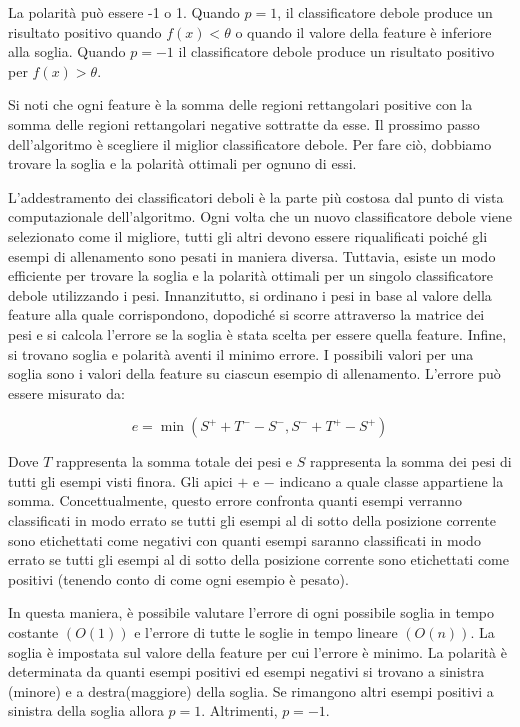 La polarità può essere -1 o 1. Quando $p=1$, il classificatore debole produce un risultato positivo quando $f(x)<\theta$ o quando il valore della feature è inferiore alla soglia. Quando $p=-1$ il classificatore debole produce un risultato positivo per $f(x)>\theta$.\newpage

Si noti che ogni feature è la somma delle regioni rettangolari positive con la somma delle regioni rettangolari negative sottratte da esse. Il prossimo passo dell'algoritmo è scegliere il miglior classificatore debole. Per fare ciò, dobbiamo trovare la soglia e la polarità ottimali per ognuno di essi.

L'addestramento dei classificatori deboli è la parte più costosa dal punto di vista computazionale dell'algoritmo. Ogni volta che un nuovo classificatore debole viene selezionato come il migliore, tutti gli altri devono essere riqualificati poiché gli esempi di allenamento sono pesati in maniera diversa. Tuttavia, esiste un modo efficiente per trovare la soglia e la polarità ottimali per un singolo classificatore debole utilizzando i pesi. Innanzitutto, si ordinano i pesi in base al valore della feature alla quale corrispondono, dopodiché si scorre attraverso la matrice dei pesi e si calcola l'errore se la soglia è stata scelta per essere quella feature. Infine, si trovano soglia e polarità aventi il minimo errore. I possibili valori per una soglia sono i valori della feature su ciascun esempio di allenamento. L'errore può essere misurato da:

$$ e = \min{(S^+ + T^- - S^-, S^- + T^+ - S^+)} $$

Dove $T$ rappresenta la somma totale dei pesi e $S$ rappresenta la somma dei pesi di tutti gli esempi visti finora. Gli apici $+$ e $-$ indicano a quale classe appartiene la somma. Concettualmente, questo errore confronta quanti esempi verranno classificati in modo errato se tutti gli esempi al di sotto della posizione corrente sono etichettati come negativi con quanti esempi saranno classificati in modo errato se tutti gli esempi al di sotto della posizione corrente sono etichettati come positivi (tenendo conto di come ogni esempio è pesato).

In questa maniera, è possibile valutare l'errore di ogni possibile soglia in tempo costante $(O(1))$ e l'errore di tutte le soglie in tempo lineare $(O(n))$. La soglia è impostata sul valore della feature per cui l'errore è minimo. La polarità è determinata da quanti esempi positivi ed esempi negativi si trovano a sinistra (minore) e a destra(maggiore) della soglia. Se rimangono altri esempi positivi a sinistra della soglia allora $p=1$. Altrimenti, $p=-1$.

